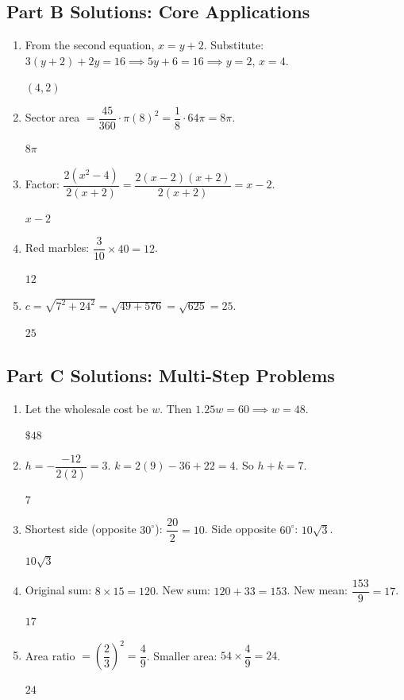 \documentclass[14pt]{extarticle}
\begin{document}
\subsection*{Part B Solutions: Core Applications}
\begin{enumerate}
  \item From the second equation, \(x = y + 2\). Substitute: \(3(y + 2) + 2y = 16 \implies 5y + 6 = 16 \implies y = 2\), \(x = 4\).

  \(\boxed{(4, 2)}\)

  \item Sector area \(= \dfrac{45}{360} \cdot \pi(8)^2 = \dfrac{1}{8} \cdot 64\pi = 8\pi\).

  \(\boxed{8\pi}\)

  \item Factor: \(\dfrac{2(x^2 - 4)}{2(x + 2)} = \dfrac{2(x-2)(x+2)}{2(x+2)} = x - 2\).

  \(\boxed{x - 2}\)

  \item Red marbles: \(\dfrac{3}{10} \times 40 = 12\).

  \(\boxed{12}\)

  \item \(c = \sqrt{7^2 + 24^2} = \sqrt{49 + 576} = \sqrt{625} = 25\).

  \(\boxed{25}\)
\end{enumerate}

\subsection*{Part C Solutions: Multi-Step Problems}
\begin{enumerate}
  \item Let the wholesale cost be \(w\). Then \(1.25w = 60 \implies w = 48\).

  \(\boxed{\$48}\)

  \item \(h = -\dfrac{-12}{2(2)} = 3\). \(k = 2(9) - 36 + 22 = 4\). So \(h + k = 7\).

  \(\boxed{7}\)

  \item Shortest side (opposite \(30^\circ\)): \(\dfrac{20}{2} = 10\). Side opposite \(60^\circ\): \(10\sqrt{3}\).

  \(\boxed{10\sqrt{3}}\)

  \item Original sum: \(8 \times 15 = 120\). New sum: \(120 + 33 = 153\). New mean: \(\dfrac{153}{9} = 17\).

  \(\boxed{17}\)

  \item Area ratio \(= \left(\dfrac{2}{3}\right)^2 = \dfrac{4}{9}\). Smaller area: \(54 \times \dfrac{4}{9} = 24\).

  \(\boxed{24}\)
\end{enumerate}
\end{document}
